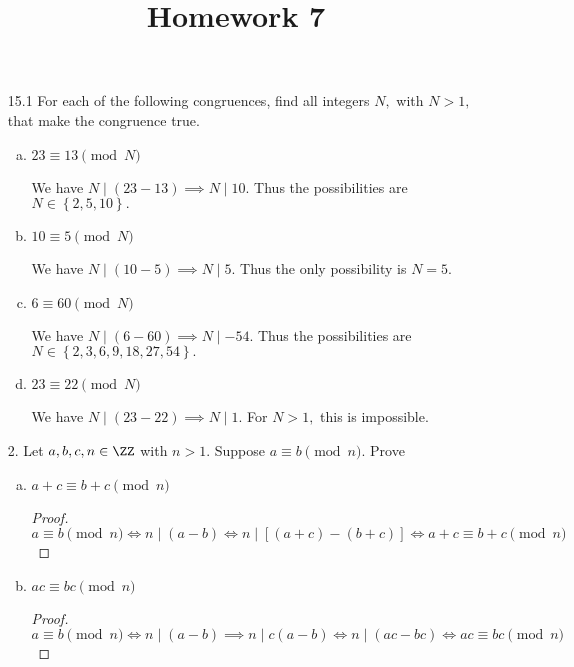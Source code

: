 \documentclass{article}
\begin{document}
\title{Homework 7}
\maketitle
\thispagestyle{fancy}

\begin{itemize}
	\item[15.1] For each of the following congruences, find all integers $N,$ with $N>1,$ that make the congruence true.
		\begin{enumerate}[(a)]
			\item $23\equiv 13\pmod N$
				\begin{soln}
					We have $N\mid(23-13)\implies N\mid 10.$ Thus the possibilities are $N\in \left\{ 2, 5, 10 \right\}.$
				\end{soln}

			\item $10\equiv 5\pmod N$
				\begin{soln}
					We have $N\mid (10-5)\implies N\mid 5.$ Thus the only possibility is $N=5.$
				\end{soln}

			\item $6\equiv 60\pmod N$
				\begin{soln}
					We have $N\mid (6-60)\implies N\mid -54.$ Thus the possibilities are $N\in\left\{ 2, 3, 6, 9, 18, 27, 54\right\}.$
				\end{soln}

			\item $23\equiv 22\pmod N$
				\begin{soln}
					We have $N\mid (23-22)\implies N\mid 1.$ For $N>1,$ this is impossible.
				\end{soln}

		\end{enumerate}

	\item[2.] Let $a, b, c, n\in\ZZ$ with $n>1.$ Suppose $a\equiv b\pmod n.$ Prove
		\begin{enumerate}[(a)]
			\item $a+c\equiv b+c\pmod n$
				\begin{proof}
					\[a\equiv b\pmod n \iff n\mid(a-b)\iff n\mid \left[ (a+c)-(b+c) \right]\iff a+c\equiv b+c\pmod n\]
				\end{proof}

			\item $ac\equiv bc\pmod n$
				\begin{proof}
					\[a\equiv b\pmod n \iff n\mid(a-b)\implies n\mid c(a-b)\iff n\mid(ac-bc)\iff ac\equiv bc\pmod n\]
				\end{proof}
				

\end{enumerate}
\end{itemize}
\end{document}
